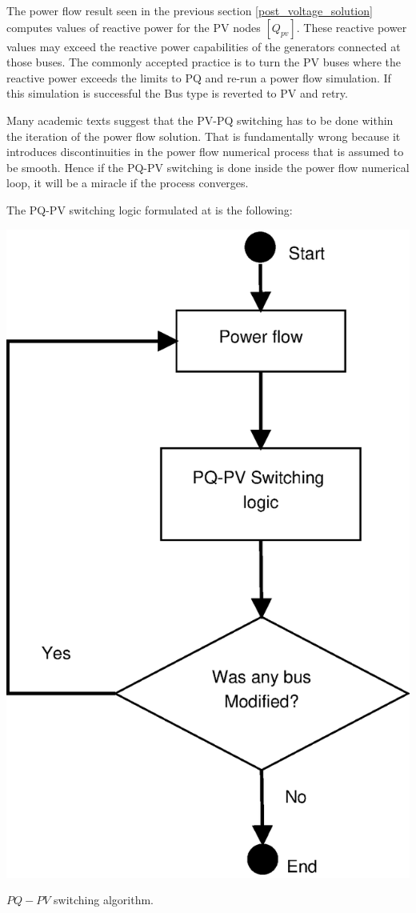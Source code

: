 \documentclass[nols,a4paper,twoside,notoc,fleqn]{tufte-book}
\begin{document}
The power flow result seen in the previous section \ref{post_voltage_solution} computes values of reactive power for the PV nodes $[Q_{pv}]$. These reactive power values may exceed the reactive power capabilities of the generators connected at those buses. The commonly accepted practice is to turn the PV buses where the reactive power exceeds the limits to PQ and re-run a power flow simulation. If this simulation is successful the Bus type is reverted to PV and retry.

Many academic texts suggest that the PV-PQ switching has to be done within the iteration of the power flow solution. That is fundamentally wrong because it introduces discontinuities in the power flow numerical process that is assumed to be smooth. Hence if the PQ-PV switching is done inside the power flow numerical loop, it will be a miracle if the process converges.


The PQ-PV switching logic formulated at \cite{zhao2008pv} is the following:

\begin{marginfigure}
	\includegraphics[width=0.9\linewidth]{img/PQ_PV_switching.eps}
	\caption{$PQ-PV$ switching algorithm.}
	\label{pq_pv_switching}
\end{marginfigure}
\end{document}
